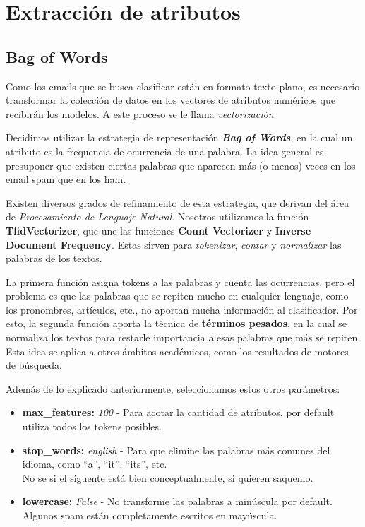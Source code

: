 \section{Extracción de atributos}
\subsection{Bag of Words}
Como los emails que se busca clasificar están en formato texto plano, es necesario transformar la colección de datos en los vectores de atributos numéricos que recibirán los modelos. A este proceso se le llama \textit{vectorización}.

Decidimos utilizar la estrategia de representación \textbf{\textit{Bag of Words}}, en la cual un atributo es la frequencia de ocurrencia de una palabra. La idea general es presuponer que existen ciertas palabras que aparecen más (o menos) veces en los email spam que en los ham. 

Existen diversos grados de refinamiento de esta estrategia, que derivan del área de \textit{Procesamiento de Lenguaje Natural}. Nosotros utilizamos la función \textbf{TfidVectorizer}, que une las funciones \textbf{Count Vectorizer} y \textbf{Inverse Document Frequency}. Estas sirven para \textit{tokenizar}, \textit{contar} y \textit{normalizar} las palabras de los textos.

La primera función asigna tokens a las palabras y cuenta las ocurrencias, pero el problema es que las palabras que se repiten mucho en cualquier lenguaje, como los pronombres, artículos, etc., no aportan mucha información al clasificador. Por esto, la segunda función aporta la técnica de \textbf{términos pesados}, en la cual se normaliza los textos para restarle importancia a esas palabras que más se repiten. Esta idea se aplica a otros ámbitos académicos, como los resultados de motores de búsqueda.

Además de lo explicado anteriormente, seleccionamos estos otros parámetros:
\begin{itemize}
\item \textbf{max\_features:} \textit{100} - Para acotar la cantidad de atributos, por default utiliza todos los tokens posibles.
\item \textbf{stop\_words:} \textit{english} - Para que elimine las palabras más comunes del idioma, como ``a'', ``it'', ``its'', etc.\\

No se si el siguente está bien conceptualmente, si quieren saquenlo.
\item \textbf{lowercase:} \textit{False} - No transforme las palabras a minúscula por default. Algunos spam están completamente escritos en mayúscula.
\end{itemize}

